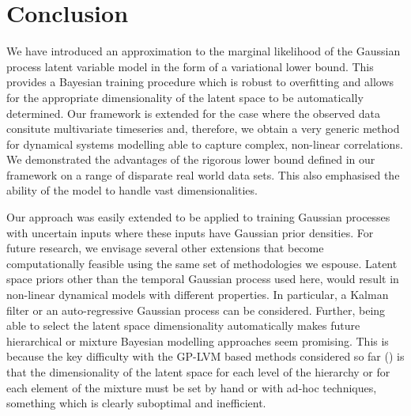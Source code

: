 
\section{\label{section:conclusion} Conclusion}

We have introduced an approximation to the marginal likelihood of the Gaussian process latent variable model
in the form of a variational lower bound. This provides a Bayesian training procedure which is robust
to overfitting and allows for the appropriate dimensionality of the latent space to be automatically determined.
Our framework is extended for the case where the observed data consitute multivariate timeseries and,
therefore, we obtain a very generic method for dynamical systems modelling able to capture complex, non-linear
correlations. We demonstrated the advantages of the rigorous lower bound defined in our framework on a range of
disparate real world data sets. This also emphasised the ability of the model to handle vast dimensionalities.

\par Our approach was easily extended to be applied to training Gaussian processes with uncertain inputs where these
inputs have Gaussian prior densities. For future research, we envisage several other extensions that become computationally
feasible using the same set of methodologies we espouse. Latent space priors other than the
temporal Gaussian process used here, would result in non-linear dynamical models with different properties. In
particular, a Kalman filter or an auto-regressive Gaussian process \cite{GPDM} can be considered.
Further, being able to select the latent space dimensionality automatically makes future hierarchical
or mixture Bayesian modelling approaches seem promising. This is because the key difficulty with the
GP-LVM based methods
considered so far (\eg \cite{hgplvm, Salzmann:2010vh}) is that the dimensionality of the latent
space for each level of the hierarchy or for
each element of the mixture must be set by hand or with ad-hoc techniques, something which is clearly
suboptimal and inefficient.